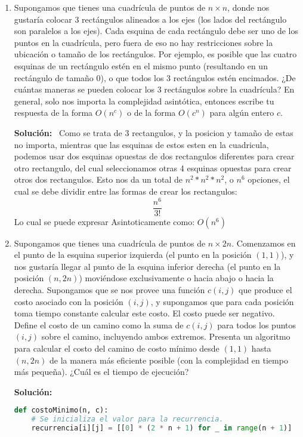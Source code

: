 \documentclass[11pt,letterpaper]{article}
\newenvironment{solution}{%
  \noindent\begin{shaded}
  \textbf{Solución:}\ }{
  \end{shaded}%
}
\begin{document}
\begin{enumerate}
\item%
  Supongamos que tienes una cuadrícula de puntos de \(n \times n\),
  donde nos gustaría colocar \(3\) rectángulos alineados a los ejes
  (los lados del rectángulo son paralelos a los ejes).  Cada esquina
  de cada rectángulo debe ser uno de los puntos en la cuadrícula, pero
  fuera de eso no hay restricciones sobre la ubicación o tamaño de los
  rectángulos.  Por ejemplo, es posible que las cuatro esquinas de un
  rectángulo estén en el mismo punto (resultando en un rectángulo de
  tamaño \(0\)), o que todos los \(3\) rectángulos estén encimados.
  ¿De cuántas maneras se pueden colocar los \(3\) rectángulos sobre la
  cuadrícula?  En general, solo nos importa la complejidad asintótica,
  entonces escribe tu respuesta de la forma \(O(n^c)\) o de la forma
  \(O(c^n)\) para algún entero \(c\).
  \begin{solution}
     Como se trata de 3 rectangulos, y la posicion y tamaño de estas no importa, mientras que las esquinas de estos esten en la cuadricula, podemos usar dos esquinas opuestas de dos rectangulos diferentes para crear otro rectangulo, del cual seleccionamos otras 4 esquinas opuestas para crear otros dos rectangulos. Esto nos da un total de $n^2 * n^2 * n^2$, o $ n^6 $ opciones, el cual se debe dividir entre las formas de crear los rectangulos:
     \[ \frac{n^6}{3!} \]
     Lo cual se puede expresar Asintoticamente como: $ O(n^6) $
  \end{solution}
\newpage
\item%
  Supongamos que tienes una cuadrícula de puntos de \(n \times 2n\).
  Comenzamos en el punto de la esquina superior izquierda (el punto en
  la posición \((1,1)\)), y nos gustaría llegar al punto de la esquina
  inferior derecha (el punto en la posición \((n, 2n)\)) moviéndose
  exclusivamente o hacia abajo o hacia la derecha.  Supongamos que se
  nos provee una función \(c(i,j)\) que produce el costo asociado con
  la posición \((i,j)\), y supongamos que para cada posición toma
  tiempo constante calcular este costo.  El costo puede ser negativo.
  Define el costo de un camino como la suma de \(c(i,j)\) para todos
  los puntos \((i,j)\) sobre el camino, incluyendo ambos extremos.
  Presenta un algoritmo para calcular el costo del camino de costo
  mínimo desde \((1,1)\) hasta \((n,2n)\) de la manera más eficiente
  posible (con la complejidad en tiempo más pequeña).  ¿Cuál es el
  tiempo de ejecución?
  \begin{solution}
    \begin{lstlisting}[language=Python]
    def costoMinimo(n, c):
    # Se inicializa el valor para la recurrencia.
    recurrencia[i][j] = [[0] * (2 * n + 1) for _ in range(n + 1)]


\end{lstlisting}
\end{solution}
\end{enumerate}
\end{document}
